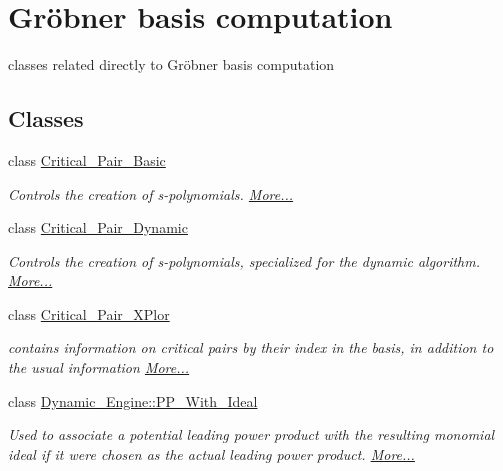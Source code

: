 \hypertarget{group___g_b_computation}{}\section{Gr\"{o}bner basis computation}
\label{group___g_b_computation}


classes related directly to Gr\"{o}bner basis computation  


\subsection*{Classes}
\begin{DoxyCompactItemize}
\item 
class \hyperlink{group___g_b_computation_class_critical___pair___basic}{Critical\+\_\+\+Pair\+\_\+\+Basic}
\begin{DoxyCompactList}\small\item\em Controls the creation of s-\/polynomials.  \hyperlink{group___g_b_computation_class_critical___pair___basic}{More...}\end{DoxyCompactList}\item 
class \hyperlink{group___g_b_computation_class_critical___pair___dynamic}{Critical\+\_\+\+Pair\+\_\+\+Dynamic}
\begin{DoxyCompactList}\small\item\em Controls the creation of s-\/polynomials, specialized for the dynamic algorithm.  \hyperlink{group___g_b_computation_class_critical___pair___dynamic}{More...}\end{DoxyCompactList}\item 
class \hyperlink{group___g_b_computation_class_critical___pair___x_plor}{Critical\+\_\+\+Pair\+\_\+\+X\+Plor}
\begin{DoxyCompactList}\small\item\em contains information on critical pairs by their index in the basis, in addition to the usual information  \hyperlink{group___g_b_computation_class_critical___pair___x_plor}{More...}\end{DoxyCompactList}\item 
class \hyperlink{group___g_b_computation_class_dynamic___engine_1_1_p_p___with___ideal}{Dynamic\+\_\+\+Engine\+::\+P\+P\+\_\+\+With\+\_\+\+Ideal}
\begin{DoxyCompactList}\small\item\em Used to associate a potential leading power product with the resulting monomial ideal if it were chosen as the actual leading power product.  \hyperlink{group___g_b_computation_class_dynamic___engine_1_1_p_p___with___ideal}{More...}\end{DoxyCompactList}\item 

\end{DoxyCompactItemize}
